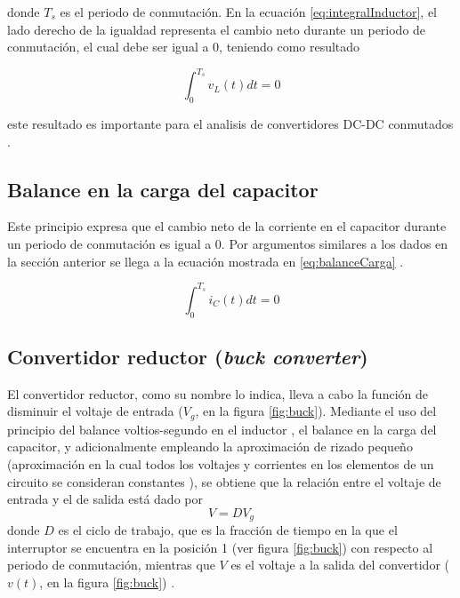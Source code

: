 donde $T_s$ es el periodo de conmutación. En la ecuación \ref{eq:integralInductor}, el lado
derecho de la igualdad representa el cambio neto durante un periodo de conmutación, el cual 
debe ser igual a 0, teniendo como resultado

\begin{equation}
    \int_0^{T_s} v_L(t) d t = 0
\end{equation}

este resultado es importante para el analisis de convertidores DC-DC conmutados \cite{erickson_fundamentals_2020}.

\subsection{Balance en la carga del capacitor}

Este principio expresa que el cambio neto de la corriente en el capacitor durante un periodo 
de conmutación es igual a 0. Por argumentos similares a los dados en la sección anterior se 
llega a la ecuación mostrada en \ref{eq:balanceCarga} \cite{erickson_fundamentals_2020}.

\begin{equation}
    \int_0^{T_s} i_C(t) d t = 0
    \label{eq:balanceCarga}
\end{equation}

\subsection{Convertidor reductor (\textit{buck converter})}

El convertidor reductor, como su nombre lo indica, lleva a cabo la función de disminuir
 el voltaje de entrada ($V_g$, en la figura \ref{fig:buck}). Mediante el uso del principio del
balance voltios-segundo en el inductor , el balance en la carga del capacitor, y
 adicionalmente empleando la aproximación de rizado pequeño (aproximación en la cual todos los 
voltajes y corrientes en los elementos de un circuito se consideran constantes  \cite{erickson_fundamentals_2020}),
 se obtiene que la relación entre el voltaje de entrada y el de salida está dado por 
 \begin{equation}
    V=DV_g  
    \label{eq:salida_buck}
 \end{equation}
donde $D$ es el ciclo de trabajo, que es la fracción de tiempo en la que el
interruptor se encuentra en la posición 1 (ver figura \ref{fig:buck}) con
respecto al periodo de conmutación, mientras que $V$ es el voltaje 
a la salida del convertidor ($v(t)$, en la figura \ref{fig:buck})
 \cite{erickson_fundamentals_2020}. 



